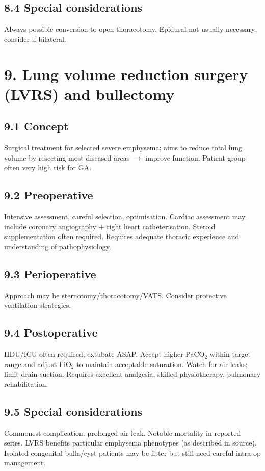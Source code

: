 \documentclass[11pt,a4paper]{article}
\begin{document}
\subsection{8.4 Special considerations}
Always possible conversion to open thoracotomy. Epidural not usually necessary; consider if bilateral.

\section{9. Lung volume reduction surgery (LVRS) and bullectomy}

\subsection{9.1 Concept}
Surgical treatment for selected severe emphysema; aims to reduce total lung volume by resecting most diseased areas \(\rightarrow\) improve function. Patient group often very high risk for GA.

\subsection{9.2 Preoperative}
Intensive assessment, careful selection, optimisation. Cardiac assessment may include coronary angiography + right heart catheterisation. Steroid supplementation often required. Requires adequate thoracic experience and understanding of pathophysiology.

\subsection{9.3 Perioperative}
Approach may be sternotomy/thoracotomy/VATS. Consider protective ventilation strategies.

\subsection{9.4 Postoperative}
HDU/ICU often required; extubate ASAP. Accept higher PaCO\(_2\) within target range and adjust \(\mathrm{FiO_2}\) to maintain acceptable saturation. Watch for air leaks; limit drain suction. Requires excellent analgesia, skilled physiotherapy, pulmonary rehabilitation.

\subsection{9.5 Special considerations}
Commonest complication: prolonged air leak. Notable mortality in reported series. LVRS benefits particular emphysema phenotypes (as described in source). Isolated congenital bulla/cyst patients may be fitter but still need careful intra-op management.
\end{document}
